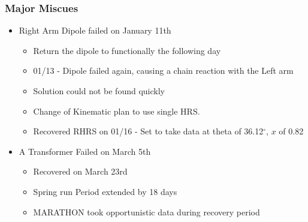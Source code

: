 \documentclass{beamer}
\begin{document}
\begin{frame}
\frametitle{Major Miscues}
\begin{block}{}
	\begin{itemize}
		\item Right Arm Dipole failed on January 11th
		\begin{itemize}
			\item Return the dipole to functionally the following day
			\item 01/13 - Dipole failed again, causing a chain reaction with the Left arm
			\item Solution could not be found quickly
			\item Change of Kinematic plan to use single HRS.
			\item Recovered RHRS on 01/16 - Set to take data at theta of 36.12$^\circ$,  $x$ of 0.82 
		\end{itemize}
		\item A Transformer Failed on March 5th 
		\begin{itemize}
			\item Recovered on March 23rd
			\item Spring run Period extended by 18 days
			\item MARATHON took opportunistic data during recovery period 
		\end{itemize}
	\end{itemize}
\end{block}

\end{frame}
\end{document}
